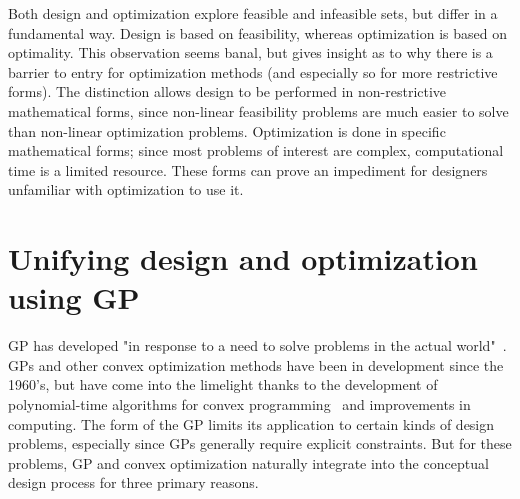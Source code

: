 Both design and
optimization explore feasible and infeasible sets, but differ in a fundamental way.
Design is based on feasibility, whereas optimization is based on optimality.
This observation seems banal, but gives insight as to why there is a barrier
to entry for optimization methods (and especially so for more restrictive forms).
The distinction allows design to be performed
in non-restrictive mathematical forms, since non-linear feasibility problems are
much easier to solve than non-linear optimization problems. Optimization is
done in specific mathematical forms; since most problems of interest are complex,
computational time is a limited resource. These forms can prove
an impediment for designers unfamiliar with optimization to use it.

\section{Unifying design and optimization using GP}

\gls{GP} has developed "in response to a need to solve problems in the actual
world"~\cite{duffingp}. \gls{GP}s and other convex optimization methods have been
in development since the 1960's, but have come into the limelight thanks to the development of
polynomial-time algorithms for convex programming~\cite{interior_point} and
improvements in computing. The form of the \gls{GP} limits its application
to certain kinds of design
problems, especially since \gls{GP}s generally require explicit constraints.
But for these problems, \gls{GP} and convex
optimization naturally integrate into the conceptual design process
for three primary reasons.

